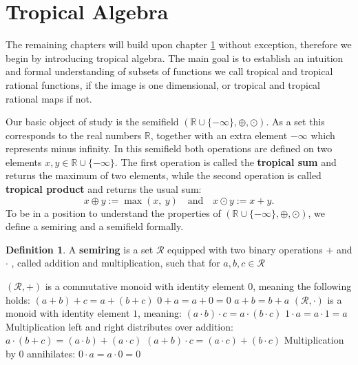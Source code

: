 \documentclass{article}
\theoremstyle{definition}
\newtheorem{definition}[theorem]{Definition}
\begin{document}
\section{Tropical Algebra}
\label{sec:trop_algebra}

The remaining chapters will build upon chapter \ref{sec:trop_algebra} without exception, therefore we begin by introducing tropical algebra. The main goal is to establish an intuition and formal understanding of subsets of functions we call tropical and tropical rational functions, if the image is one dimensional, or tropical and tropical rational maps if not.

Our basic object of study is the semifield $( \mathbb{R} \cup \{- \infty \} , \oplus , \odot )$. As a set this corresponds to the real numbers $ \mathbb{R} $, together with an extra element $- \infty $ which represents minus infinity. In this semifield both operations are defined on two elements $x, y \in \mathbb{R} \cup \{- \infty \}$. The first operation is called the \textbf{tropical sum} and returns the maximum of two elements, while the second operation is called \textbf{tropical product} and returns the usual sum:
$$ x \oplus y := \max(x,\ y) \quad \text{and} \quad x \odot y := x+y.$$
To be in a position to understand the properties of $( \mathbb{R} \cup \{- \infty \} , \oplus , \odot )$, we define a semiring and a semifield formally.
\begin{definition}\hspace{1sp}\cite{berstel1985theory}
A \textbf{semiring} is a set $\mathcal{R}$ equipped with two binary operations $+$ and $\cdot$ , called addition and multiplication, such that for $a, b, c \in \mathcal{R}$ \\
\begin{outline}
  \1 $(\mathcal{R}, +)$ is a commutative monoid with identity element 0, meaning the following holds:
    \2 $(a + b) + c = a + (b + c)$
    \2 $0 + a = a + 0 = 0$
    \2 $a + b = b + a$
  \1 $(\mathcal{R}, \cdot)$ is a monoid with identity element $1$, meaning:
    \2 $(a \cdot b) \cdot c = a \cdot (b \cdot c)$
    \2 $ 1 \cdot a = a \cdot 1 = a $
  \1 Multiplication left and right distributes over addition:
    \2 $ a \cdot (b + c) = (a \cdot b) + (a \cdot c)$
    \2 $ (a + b) \cdot c = (a \cdot c) + (b \cdot c)$
  \1 Multiplication by 0 annihilates:
    \2 $ 0 \cdot a = a \cdot 0 = 0$
\end{outline}
\end{definition}
\end{document}
